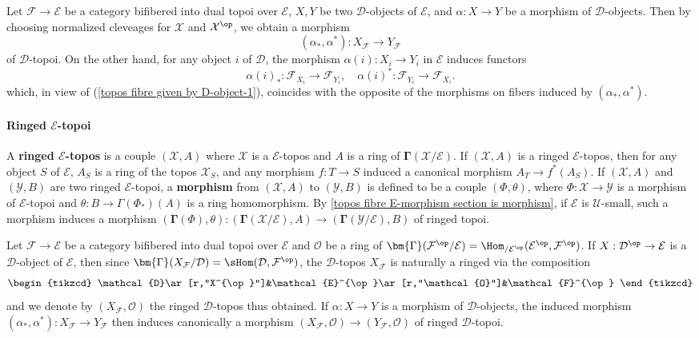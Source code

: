 \begin{example}
Let $\mathcal{F}\to\mathcal{E}$ be a category bifibered into dual topoi over $\mathcal{E}$, $X,Y$ be two $\mathcal{D}$-objects of $\mathcal{E}$, and $\alpha:X\to Y$ be a morphism of $\mathcal{D}$-objects. Then by choosing normalized cleveages for $\mathcal{X}$ and $\mathcal{X}^{\op}$, we obtain a morphism
\[(\alpha_*,\alpha^*):X_\mathcal{F}\to Y_\mathcal{F}\]
of $\mathcal{D}$-topoi. On the other hand, for any object $i$ of $\mathcal{D}$, the morphism $\alpha(i):X_i\to Y_i$ in $\mathcal{E}$ induces functors
\[\alpha(i)_*:\mathcal{F}_{X_i}\to \mathcal{F}_{Y_i},\quad \alpha(i)^*:\mathcal{F}_{Y_i}\to\mathcal{F}_{X_i}.\]
which, in view of (\ref{topos fibre given by D-object-1}), coincides with the opposite of the morphisms on fibers induced by $(\alpha_*,\alpha^*)$.
\end{example}

\paragraph{Ringed \texorpdfstring{$\mathcal{E}$}{E}-topoi}
A \textbf{ringed $\mathcal{E}$-topos} is a couple $(\mathcal{X},A)$ where $\mathcal{X}$ is a $\mathcal{E}$-topos and $A$ is a ring of $\bm{\Gamma}(\mathcal{X}/\mathcal{E})$. If $(\mathcal{X},A)$ is a ringed $\mathcal{E}$-topos, then for any object $S$ of $\mathcal{E}$, $A_S$ is a ring of the topos $\mathcal{X}_S$, and any morphism $f:T\to S$ induced a canonical morphism $A_T\to f^*(A_S)$. If $(\mathcal{X},A)$ and $(\mathcal{Y},B)$ are two ringed $\mathcal{E}$-topoi, a \textbf{morphism} from $(\mathcal{X},A)$ to $(\mathcal{Y},B)$ is defined to be a couple $(\Phi,\theta)$, where $\Phi:\mathcal{X}\to\mathcal{Y}$ is a morphism of $\mathcal{E}$-topoi and $\theta:B\to\Gamma(\Phi_*)(A)$ is a ring homomorphism. By \cref{topos fibre E-morphism section is morphism}, if $\mathcal{E}$ is $\mathscr{U}$-small, such a morphism induces a morphism $(\bm{\Gamma}(\Phi),\theta):(\bm{\Gamma}(\mathcal{X}/\mathcal{E}),A)\to (\bm{\Gamma}(\mathcal{Y}/\mathcal{E}),B)$ of ringed topoi.

\begin{example}
Let $\mathcal{F}\to\mathcal{E}$ be a category bifibered into dual topoi over $\mathcal{E}$ and $\mathcal{O}$ be a ring of $\bm{\Gamma}(\mathcal{F}^{\op}/\mathcal{E})=\Hom_{/\mathcal{E}^{\op}}(\mathcal{E}^{\op},\mathcal{F}^{\op})$. If $X:\mathcal{D}^{\op}\to\mathcal{E}$ is a $\mathcal{D}$-object of $\mathcal{E}$, then since $\bm{\Gamma}(X_\mathcal{F}/\mathcal{D})=\sHom(\mathcal{D},\mathcal{F}^{\op})$, the $\mathcal{D}$-topos $X_\mathcal{F}$ is naturally a ringed via the composition
\[\begin{tikzcd}
\mathcal{D}\ar[r,"X^{\op}"]&\mathcal{E}^{\op}\ar[r,"\mathcal{O}"]&\mathcal{F}^{\op}
\end{tikzcd}\]
and we denote by $(X_\mathcal{F},\mathcal{O})$ the ringed $\mathcal{D}$-topos thus obtained. If $\alpha:X\to Y$ is a morphism of $\mathcal{D}$-objects, the induced morphism $(\alpha_*,\alpha^*):X_\mathcal{F}\to Y_\mathcal{F}$ then induces canonically a morphism $(X_\mathcal{F},\mathcal{O})\to (Y_\mathcal{F},\mathcal{O})$ of ringed $\mathcal{D}$-topoi.
\end{example}

